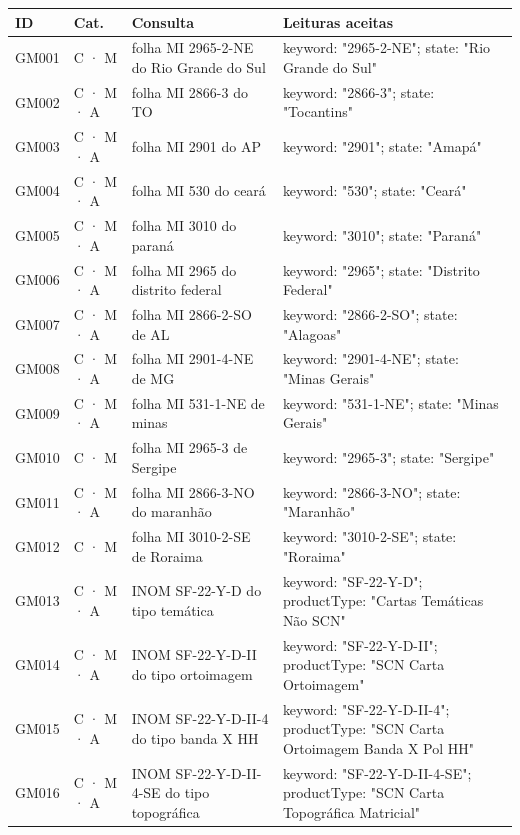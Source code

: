 {\footnotesize
\begin{longtable}{|p{1.1cm}|p{1.3cm}|p{5.4cm}|p{6.3cm}|}
\hline
\textbf{ID} & \textbf{Cat.} & \textbf{Consulta} & \textbf{Leituras aceitas} \\ \hline
\endhead
GM001 & C · M & folha MI 2965-2-NE do Rio Grande do Sul & keyword: "2965-2-NE"; state: "Rio Grande do Sul" \\ \hline
GM002 & C · M · A & folha MI 2866-3 do TO & keyword: "2866-3"; state: "Tocantins" \\ \hline
GM003 & C · M · A & folha MI 2901 do AP & keyword: "2901"; state: "Amapá" \\ \hline
GM004 & C · M · A & folha MI 530 do ceará & keyword: "530"; state: "Ceará" \\ \hline
GM005 & C · M · A & folha MI 3010 do paraná & keyword: "3010"; state: "Paraná" \\ \hline
GM006 & C · M · A & folha MI 2965 do distrito federal & keyword: "2965"; state: "Distrito Federal" \\ \hline
GM007 & C · M · A & folha MI 2866-2-SO de AL & keyword: "2866-2-SO"; state: "Alagoas" \\ \hline
GM008 & C · M · A & folha MI 2901-4-NE de MG & keyword: "2901-4-NE"; state: "Minas Gerais" \\ \hline
GM009 & C · M · A & folha MI 531-1-NE de minas & keyword: "531-1-NE"; state: "Minas Gerais" \\ \hline
GM010 & C · M & folha MI 2965-3 de Sergipe & keyword: "2965-3"; state: "Sergipe" \\ \hline
GM011 & C · M · A & folha MI 2866-3-NO do maranhão & keyword: "2866-3-NO"; state: "Maranhão" \\ \hline
GM012 & C · M & folha MI 3010-2-SE de Roraima & keyword: "3010-2-SE"; state: "Roraima" \\ \hline
GM013 & C · M · A & INOM SF-22-Y-D do tipo temática & keyword: "SF-22-Y-D"; productType: "Cartas Temáticas Não SCN" \\ \hline
GM014 & C · M · A & INOM SF-22-Y-D-II do tipo ortoimagem & keyword: "SF-22-Y-D-II"; productType: "SCN Carta Ortoimagem" \\ \hline
GM015 & C · M · A & INOM SF-22-Y-D-II-4 do tipo banda X HH & keyword: "SF-22-Y-D-II-4"; productType: "SCN Carta Ortoimagem Banda X Pol HH" \\ \hline
GM016 & C · M · A & INOM SF-22-Y-D-II-4-SE do tipo topográfica & keyword: "SF-22-Y-D-II-4-SE"; productType: "SCN Carta Topográfica Matricial" \\ \hline

\end{longtable}}
